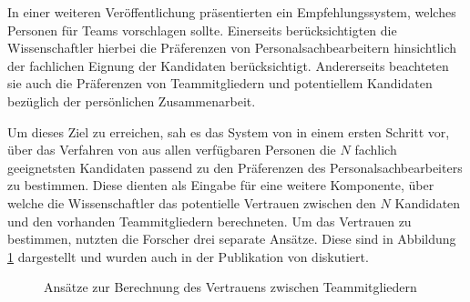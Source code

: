 In einer weiteren Veröffentlichung präsentierten \textcite[S. 1]{malinowski:2005} ein Empfehlungssystem, welches Personen für Teams vorschlagen sollte. Einerseits berücksichtigten die Wissenschaftler hierbei die Präferenzen von Personalsachbearbeitern hinsichtlich der fachlichen Eignung der Kandidaten berücksichtigt. Andererseits beachteten sie auch die Präferenzen von Teammitgliedern und potentiellem Kandidaten bezüglich der persönlichen Zusammenarbeit.

Um dieses Ziel zu erreichen, sah es das System von \textcite[S. 4ff.]{malinowski:2005} in einem ersten Schritt vor, über das Verfahren von \textcite[S. 8ff.]{faerber:2003} aus allen verfügbaren Personen die $N$ fachlich geeignetsten Kandidaten passend zu den Präferenzen des Personalsachbearbeiters zu bestimmen. Diese dienten als Eingabe für eine weitere Komponente, über welche die Wissenschaftler das potentielle Vertrauen zwischen den $N$ Kandidaten und den vorhanden Teammitgliedern berechneten. Um das Vertrauen zu bestimmen, nutzten die Forscher drei separate Ansätze. Diese sind in Abbildung \ref{fig:verwandteArbeiten:abb2} dargestellt und wurden auch in der Publikation von \textcite[S. 5ff.]{keim:2005} diskutiert.

\begin{figure}[h]
	\centering
	
	
	\caption{Ansätze zur Berechnung des Vertrauens zwischen Teammitgliedern \cite[S. 5]{malinowski:2005}}
	\label{fig:verwandteArbeiten:abb2}
\end{figure}

